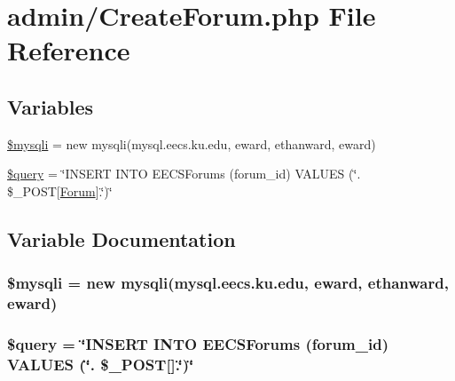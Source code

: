\hypertarget{_create_forum_8php}{}\section{admin/\+Create\+Forum.php File Reference}
\label{_create_forum_8php}
\subsection*{Variables}
\begin{DoxyCompactItemize}
\item 
\hyperlink{_create_forum_8php_a580989e8e3521433691a0351287f6315}{\$mysqli} = new mysqli(\textquotesingle{}mysql.\+eecs.\+ku.\+edu\textquotesingle{}, \textquotesingle{}eward\textquotesingle{}, \textquotesingle{}ethanward\textquotesingle{}, \textquotesingle{}eward\textquotesingle{})
\item 
\hyperlink{_create_forum_8php_af59a5f7cd609e592c41dc3643efd3c98}{\$query} = \char`\"{}I\+N\+S\+E\+RT I\+N\+TO E\+E\+C\+S\+Forums (forum\+\_\+id) V\+A\+L\+U\+ES (\textquotesingle{}\char`\"{}. \$\+\_\+\+P\+O\+ST\mbox{[}\textquotesingle{}\hyperlink{class_forum}{Forum}\textquotesingle{}\mbox{]}.\char`\"{}\textquotesingle{})\char`\"{}
\end{DoxyCompactItemize}


\subsection{Variable Documentation}
\subsubsection[{\texorpdfstring{\$mysqli}{$mysqli}}]{\setlength{\rightskip}{0pt plus 5cm}\$mysqli = new mysqli(\textquotesingle{}mysql.\+eecs.\+ku.\+edu\textquotesingle{}, \textquotesingle{}eward\textquotesingle{}, \textquotesingle{}ethanward\textquotesingle{}, \textquotesingle{}eward\textquotesingle{})}\hypertarget{_create_forum_8php_a580989e8e3521433691a0351287f6315}{}\label{_create_forum_8php_a580989e8e3521433691a0351287f6315}
\subsubsection[{\texorpdfstring{\$query}{$query}}]{\setlength{\rightskip}{0pt plus 5cm}\$query = \char`\"{}I\+N\+S\+E\+RT I\+N\+TO E\+E\+C\+S\+Forums (forum\+\_\+id) V\+A\+L\+U\+ES (\textquotesingle{}\char`\"{}. \$\+\_\+\+P\+O\+ST\mbox{[}\textquotesingle{}\mbox{]}.\char`\"{}\textquotesingle{})\char`\"{}}\hypertarget{_create_forum_8php_af59a5f7cd609e592c41dc3643efd3c98}{}\label{_create_forum_8php_af59a5f7cd609e592c41dc3643efd3c98}
